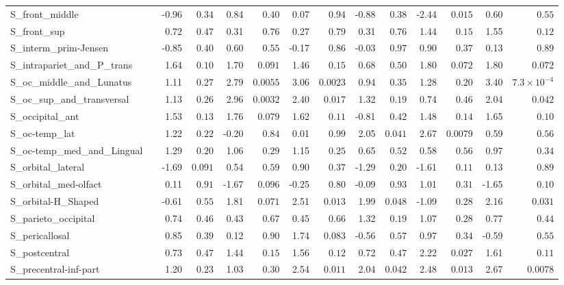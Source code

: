 {\begin{longtable}{llrrrrrrrrrrrr}
S\_front\_middle &  & -0.96 & $0.34$ & 0.84 & $0.40$ & 0.07 & $0.94$ & -0.88 & $0.38$ & -2.44 & $0.015$ & 0.60 & $0.55$ \\
S\_front\_sup &  & 0.72 & $0.47$ & 0.31 & $0.76$ & 0.27 & $0.79$ & 0.31 & $0.76$ & 1.44 & $0.15$ & 1.55 & $0.12$ \\
S\_interm\_prim-Jensen &  & -0.85 & $0.40$ & 0.60 & $0.55$ & -0.17 & $0.86$ & -0.03 & $0.97$ & 0.90 & $0.37$ & 0.13 & $0.89$ \\
S\_intrapariet\_and\_P\_trans &  & 1.64 & $0.10$ & 1.70 & $0.091$ & 1.46 & $0.15$ & 0.68 & $0.50$ & 1.80 & $0.072$ & 1.80 & $0.072$ \\
S\_oc\_middle\_and\_Lunatus &  & 1.11 & $0.27$ & 2.79 & $0.0055$ & 3.06 & $0.0023$ & 0.94 & $0.35$ & 1.28 & $0.20$ & 3.40 & $7.3{\times}10^{-4}$ \\
S\_oc\_sup\_and\_transversal &  & 1.13 & $0.26$ & 2.96 & $0.0032$ & 2.40 & $0.017$ & 1.32 & $0.19$ & 0.74 & $0.46$ & 2.04 & $0.042$ \\
S\_occipital\_ant &  & 1.53 & $0.13$ & 1.76 & $0.079$ & 1.62 & $0.11$ & -0.81 & $0.42$ & 1.48 & $0.14$ & 1.65 & $0.10$ \\
S\_oc-temp\_lat &  & 1.22 & $0.22$ & -0.20 & $0.84$ & 0.01 & $0.99$ & 2.05 & $0.041$ & 2.67 & $0.0079$ & 0.59 & $0.56$ \\
S\_oc-temp\_med\_and\_Lingual &  & 1.29 & $0.20$ & 1.06 & $0.29$ & 1.15 & $0.25$ & 0.65 & $0.52$ & 0.58 & $0.56$ & 0.97 & $0.34$ \\
S\_orbital\_lateral &  & -1.69 & $0.091$ & 0.54 & $0.59$ & 0.90 & $0.37$ & -1.29 & $0.20$ & -1.61 & $0.11$ & 0.13 & $0.89$ \\
S\_orbital\_med-olfact &  & 0.11 & $0.91$ & -1.67 & $0.096$ & -0.25 & $0.80$ & -0.09 & $0.93$ & 1.01 & $0.31$ & -1.65 & $0.10$ \\
S\_orbital-H\_Shaped &  & -0.61 & $0.55$ & 1.81 & $0.071$ & 2.51 & $0.013$ & 1.99 & $0.048$ & -1.09 & $0.28$ & 2.16 & $0.031$ \\
S\_parieto\_occipital &  & 0.74 & $0.46$ & 0.43 & $0.67$ & 0.45 & $0.66$ & 1.32 & $0.19$ & 1.07 & $0.28$ & 0.77 & $0.44$ \\
S\_pericallosal &  & 0.85 & $0.39$ & 0.12 & $0.90$ & 1.74 & $0.083$ & -0.56 & $0.57$ & 0.97 & $0.34$ & -0.59 & $0.55$ \\
S\_postcentral &  & 0.73 & $0.47$ & 1.44 & $0.15$ & 1.56 & $0.12$ & 0.72 & $0.47$ & 2.22 & $0.027$ & 1.61 & $0.11$ \\
S\_precentral-inf-part &  & 1.20 & $0.23$ & 1.03 & $0.30$ & 2.54 & $0.011$ & 2.04 & $0.042$ & 2.48 & $0.013$ & 2.67 & $0.0078$ \\

\end{longtable}}
